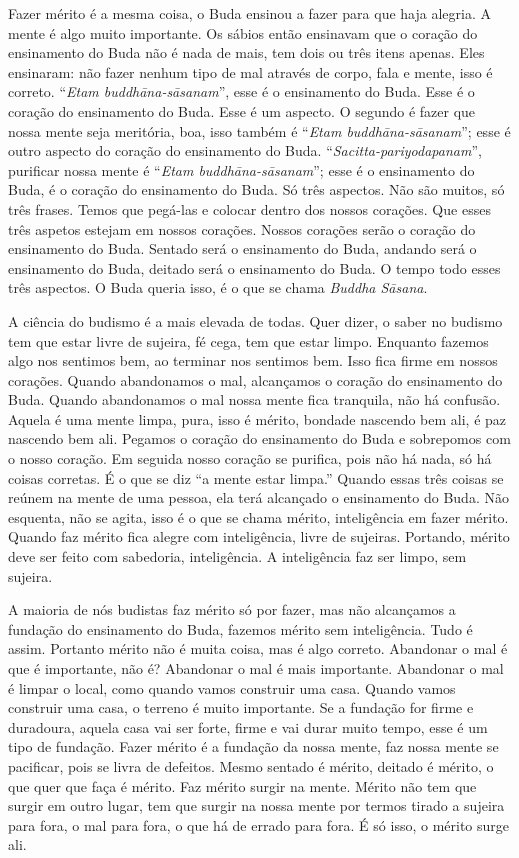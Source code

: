 Fazer mérito é a mesma coisa, o Buda ensinou a fazer para que haja
alegria. A mente é algo muito importante. Os sábios então ensinavam que
o coração do ensinamento do Buda não é nada de mais, tem dois ou três
itens apenas. Eles ensinaram: não fazer nenhum tipo de mal através de
corpo, fala e mente, isso é correto. “\textit{Etam
buddhāna-sāsanam}”, esse é o ensinamento do Buda. Esse é o coração
do ensinamento do Buda. Esse é um aspecto. O segundo é fazer que nossa
mente seja meritória, boa, isso também é “\textit{Etam
buddhāna-sāsanam}”; esse é outro aspecto do coração do ensinamento
do Buda. “\textit{Sacitta-pariyodapanam}”, purificar nossa mente é
“\textit{Etam buddhāna-sāsanam}”; esse é o ensinamento do Buda, é o
coração do ensinamento do Buda. Só três aspectos. Não são muitos, só
três frases. Temos que pegá-las e colocar dentro dos nossos corações.
Que esses três aspetos estejam em nossos corações. Nossos corações
serão o coração do ensinamento do Buda. Sentado será o ensinamento do
Buda, andando será o ensinamento do Buda, deitado será o ensinamento do
Buda. O tempo todo esses três aspectos. O Buda queria isso, é o que se
chama \textit{Buddha Sāsana}. 

A ciência do budismo é a mais elevada de todas. Quer dizer, o saber
no budismo tem que estar livre de sujeira, fé cega, tem que estar
limpo. Enquanto fazemos algo nos sentimos bem, ao terminar nos sentimos
bem. Isso fica firme em nossos corações. Quando abandonamos o mal,
alcançamos o coração do ensinamento do Buda. Quando abandonamos o mal
nossa mente fica tranquila, não há confusão. Aquela é uma mente limpa,
pura, isso é mérito, bondade nascendo bem ali, é paz nascendo bem ali.
Pegamos o coração do ensinamento do Buda e sobrepomos com o nosso
coração. Em seguida nosso coração se purifica, pois não há nada, só há
coisas corretas. É o que se diz “a mente estar limpa.” Quando essas
três coisas se reúnem na mente de uma pessoa, ela terá alcançado o
ensinamento do Buda. Não esquenta, não se agita, isso é o que se chama
mérito, inteligência em fazer mérito. Quando faz mérito fica alegre com
inteligência, livre de sujeiras. Portando, mérito deve ser feito com
sabedoria, inteligência. A inteligência faz ser limpo, sem sujeira. 

A maioria de nós budistas faz mérito só por fazer, mas não
alcançamos a fundação do ensinamento do Buda, fazemos mérito sem
inteligência. Tudo é assim. Portanto mérito não é muita coisa, mas é
algo correto. Abandonar o mal é que é importante, não é? Abandonar o
mal é mais importante. Abandonar o mal é limpar o local, como quando
vamos construir uma casa. Quando vamos construir uma casa, o terreno é
muito importante. Se a fundação for firme e duradoura, aquela casa vai
ser forte, firme e vai durar muito tempo, esse é um tipo de fundação.
Fazer mérito é a fundação da nossa mente, faz nossa mente se pacificar,
pois se livra de defeitos. Mesmo sentado é mérito, deitado é mérito, o
que quer que faça é mérito. Faz mérito surgir na mente. Mérito não tem
que surgir em outro lugar, tem que surgir na nossa mente por termos
tirado a sujeira para fora, o mal para fora, o que há de errado para
fora. É só isso, o mérito surge ali. 

